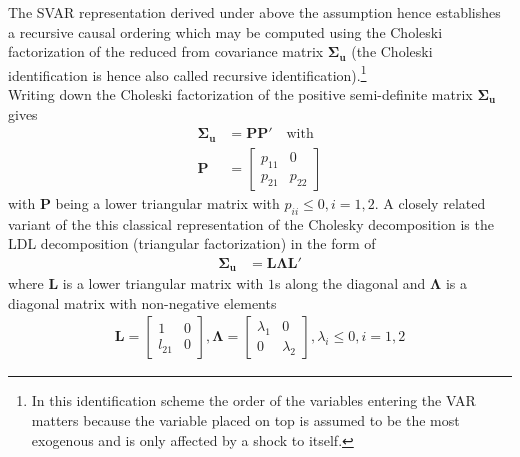 \documentclass[a4paper,11pt,listof=nochaptergap,oneside,pointednumbers,bibtotoc,bigheadings,liststotoc]{scrbook}
\newcommand{\vect}[1]{\boldsymbol{\mathbf{#1}}}
\begin{document}
The SVAR representation derived under above the assumption hence establishes a recursive causal ordering which may be computed using the Choleski factorization of the reduced from covariance matrix $\vect{\Sigma_u}$ (the Choleski identification is hence also called recursive identification).\footnote{In this identification scheme the order of the variables entering the VAR matters because the variable placed on top is assumed to be the most exogenous and is only affected by a shock to itself.} 
\\
Writing down the Choleski factorization of the positive semi-definite matrix $\vect{\Sigma_u}$ gives
\begin{equation} \label{eq:svar14}
\begin{split}
 		\vect{\Sigma_u} & = \vect{P}\vect{P'} \quad \text{with} \\
		\vect{P} & = \begin{bmatrix}
    							p_{11} & 0 \\
							p_{21} & p_{22}
 							\end{bmatrix}
\end{split}								
\end{equation}
with $\vect{P}$ being a lower triangular matrix with $p_{ii} \leq 0, i = 1, 2$. A closely related variant of the this classical representation of the Cholesky decomposition is the LDL decomposition (triangular factorization) in the form of 
\begin{equation} \label{eq:svar15}
\begin{split}
 		\vect{\Sigma_u} & = \vect{L}\vect{\Lambda}\vect{L'}
\end{split}								
\end{equation}
where $\vect{L}$ is a lower triangular matrix with $1$s along the diagonal and $\vect{\Lambda}$ is a diagonal matrix with non-negative elements
\begin{equation} \label{eq:svar16}
\begin{split}
	\vect{L} =  \begin{bmatrix}
    				1 & 0 \\
				l_{21} & 0 
 				\end{bmatrix}, 
				\vect{\Lambda} = 
					\begin{bmatrix}
    					\lambda_1 & 0 \\
					0 & \lambda_2 
 					\end{bmatrix},
					\lambda_i \leq 0, i = 1, 2
\end{split}								
\end{equation}
\end{document}
